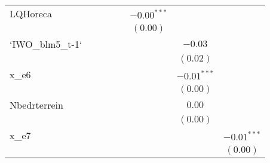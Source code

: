 \begin{center}
\begin{longtable}{l c c c c c c c }
LQHoreca         &               &              &               &               & $-0.00^{***}$ &               &               \\
                 &               &              &               &               & $(0.00)$      &               &               \\
`IWO\_blm5\_t-1` &               &              &               &               &               & $-0.03$       &               \\
                 &               &              &               &               &               & $(0.02)$      &               \\
x\_e6            &               &              &               &               &               & $-0.01^{***}$ &               \\
                 &               &              &               &               &               & $(0.00)$      &               \\
Nbedrterrein     &               &              &               &               &               & $0.00$        &               \\
                 &               &              &               &               &               & $(0.00)$      &               \\
x\_e7            &               &              &               &               &               &               & $-0.01^{***}$ \\
                 &               &              &               &               &               &               & $(0.00)$      \\
\end{longtable}
\end{center}
